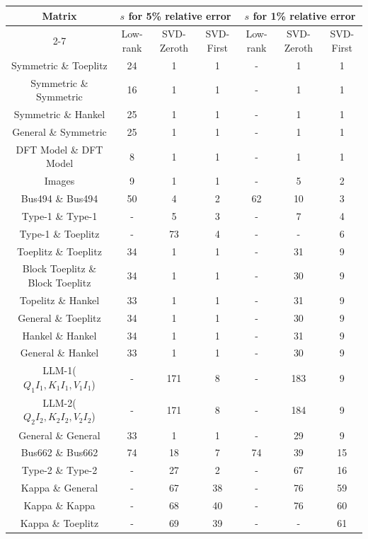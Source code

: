 \documentclass[onefignum,onetabnum]{siamart171218}
\begin{document}
\begin{table}[H]
    \centering
    \begin{tabular}{|c|c|c|c|c|c|c|}
        \hline
        \multirow{2}{*}{Matrix} & \multicolumn{3}{c|}{$s$ for 5\% relative error} & \multicolumn{3}{c|}{$s$ for 1\% relative error}\\
        \cline{2-7}
        & Low-rank & SVD-Zeroth& SVD-First& Low-rank & SVD-Zeroth& SVD-First\\
         \hline
         Symmetric \& Toeplitz & 24 & 1& 1& -& 1& 1\\
         \hline
          Symmetric \& Symmetric& 16& 1& 1& -& 1& 1   \\
         \hline
         Symmetric \& Hankel &25 & 1& 1& - & 1& 1 \\
         \hline
         General \& Symmetric &25  & 1& 1 & - & 1 & 1 \\
         \hline
         DFT Model \& DFT Model &8  &1 &1 & -&1 & 1 \\
         \hline
         Images\footnotemark[1]& 9& 1&1 & - & 5&2  \\
         \hline
        Bus494 \& Bus494\footnotemark[2]& 50 & 4&2 &62  &10 &3  \\
         \hline
         Type-1 \& Type-1\footnotemark[4]& - &5 &3 &-  &7 & 4 \\
         \hline
         Type-1 \& Toeplitz& - & 73& 4&-  & -&6  \\
         \hline
        Toeplitz \& Toeplitz &34 & 1& 1& - & 31 & 9\\
         \hline
        Block Toeplitz \& Block Toeplitz & 34& 1& 1 & - & 30 & 9\\
         \hline
        Topelitz \& Hankel&  33& 1 & 1 & - & 31& 9  \\
         \hline
         General \& Toeplitz& 34& 1& 1 & - & 30 & 9 \\
         \hline
        Hankel \& Hankel& 34 &1 & 1& -& 31& 9\\
         \hline
        General \& Hankel& 33 & 1 & 1& -& 30& 9 \\
        \hline
        LLM-1($Q_1I_1,K_1I_1,V_1I_1$)\footnotemark[4]&-&171&8&-&183&9\\
         \hline
         LLM-2($Q_2I_2, K_2I_2, V_2I_2$)\footnotemark[4]&-&171&8&-&184&9\\
         \hline
          General \& General &33  & 1& 1& - & 29& 9\\
         \hline
         Bus662 \& Bus662\footnotemark[3]& 74 &18 &7 &74  &39 &15  \\
         \hline
         Type-2 \& Type-2\footnotemark[4]& - &27 &2 & - & 67& 16 \\
         \hline
         Kappa \& General& - & 67 &38 &- &76 & 59 \\
         \hline
        Kappa \& Kappa &-  &68 & 40& - & 76& 60 \\
         \hline
        Kappa \& Toeplitz &- & 69& 39 & - &- & 61 \\
         \hline
        

\end{tabular}
\end{table}
\end{document}

